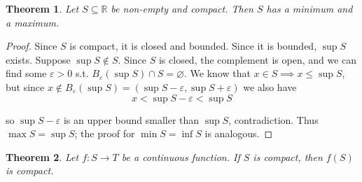\documentclass{article}
\theoremstyle{mythm}
\newtheorem{theorem}{Theorem}
\theoremstyle{mydef}
\begin{document}
\begin{theorem}
  Let $S \subseteq \mathbb{R}$ be non-empty and compact. Then $S$ has a minimum and a maximum.
\end{theorem}

\begin{proof}
  Since $S$ is compact, it is closed and bounded. Since it is bounded, $\sup S$ exists. Suppose $\sup S \notin S$.  Since $S$ is closed, the complement is open, and we can find some $\varepsilon > 0$ s.t. $B_\varepsilon(\sup S) \cap S = \varnothing$. We know that $x \in S \implies x \le \sup S$, but since $x \notin B_{\varepsilon}(\sup S) = (\sup S - \varepsilon, \sup S + \varepsilon)$ we also have
  \[
    x < \sup S - \varepsilon < \sup S
  \]

  so $\sup S - \varepsilon$ is an upper bound smaller than $\sup S$, contradiction. Thus $\max S = \sup S$; the proof for $\min S = \inf S$ is analogous.
\end{proof}

\begin{theorem}
  Let $f: S \to T$ be a continuous function. If $S$ is compact, then $f(S)$ is compact.
\end{theorem}
\end{document}
